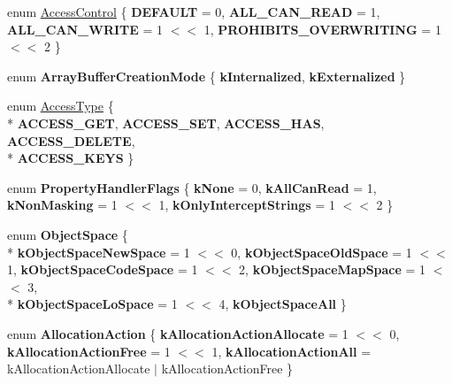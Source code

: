\begin{DoxyCompactItemize}
\item 
enum \hyperlink{namespacev8_a31d8355cb043d7d2dda3f4a52760b64e}{Access\+Control} \{ {\bfseries D\+E\+F\+A\+U\+L\+T} = 0, 
{\bfseries A\+L\+L\+\_\+\+C\+A\+N\+\_\+\+R\+E\+A\+D} = 1, 
{\bfseries A\+L\+L\+\_\+\+C\+A\+N\+\_\+\+W\+R\+I\+T\+E} = 1 $<$$<$ 1, 
{\bfseries P\+R\+O\+H\+I\+B\+I\+T\+S\+\_\+\+O\+V\+E\+R\+W\+R\+I\+T\+I\+N\+G} = 1 $<$$<$ 2
 \}
\item 
\hypertarget{namespacev8_aead63bf88a59e18b3768de9ac8d4b98d}{}enum {\bfseries Array\+Buffer\+Creation\+Mode} \{ {\bfseries k\+Internalized}, 
{\bfseries k\+Externalized}
 \}\label{namespacev8_aead63bf88a59e18b3768de9ac8d4b98d}

\item 
enum \hyperlink{namespacev8_add8bef6469c5b94706584124e610046c}{Access\+Type} \{ \\*
{\bfseries A\+C\+C\+E\+S\+S\+\_\+\+G\+E\+T}, 
{\bfseries A\+C\+C\+E\+S\+S\+\_\+\+S\+E\+T}, 
{\bfseries A\+C\+C\+E\+S\+S\+\_\+\+H\+A\+S}, 
{\bfseries A\+C\+C\+E\+S\+S\+\_\+\+D\+E\+L\+E\+T\+E}, 
\\*
{\bfseries A\+C\+C\+E\+S\+S\+\_\+\+K\+E\+Y\+S}
 \}
\item 
\hypertarget{namespacev8_af4789f0aeb8680e353901a35810cac1a}{}enum {\bfseries Property\+Handler\+Flags} \{ {\bfseries k\+None} = 0, 
{\bfseries k\+All\+Can\+Read} = 1, 
{\bfseries k\+Non\+Masking} = 1 $<$$<$ 1, 
{\bfseries k\+Only\+Intercept\+Strings} = 1 $<$$<$ 2
 \}\label{namespacev8_af4789f0aeb8680e353901a35810cac1a}

\item 
\hypertarget{namespacev8_ae7bc5b0bd1100e94d78de255daa8ebc3}{}enum {\bfseries Object\+Space} \{ \\*
{\bfseries k\+Object\+Space\+New\+Space} = 1 $<$$<$ 0, 
{\bfseries k\+Object\+Space\+Old\+Space} = 1 $<$$<$ 1, 
{\bfseries k\+Object\+Space\+Code\+Space} = 1 $<$$<$ 2, 
{\bfseries k\+Object\+Space\+Map\+Space} = 1 $<$$<$ 3, 
\\*
{\bfseries k\+Object\+Space\+Lo\+Space} = 1 $<$$<$ 4, 
{\bfseries k\+Object\+Space\+All}
 \}\label{namespacev8_ae7bc5b0bd1100e94d78de255daa8ebc3}

\item 
\hypertarget{namespacev8_ae2b70dd2abba164d9ad9ffc9f757eca9}{}enum {\bfseries Allocation\+Action} \{ {\bfseries k\+Allocation\+Action\+Allocate} = 1 $<$$<$ 0, 
{\bfseries k\+Allocation\+Action\+Free} = 1 $<$$<$ 1, 
{\bfseries k\+Allocation\+Action\+All} = k\+Allocation\+Action\+Allocate $\vert$ k\+Allocation\+Action\+Free
 \}\label{namespacev8_ae2b70dd2abba164d9ad9ffc9f757eca9}


\end{DoxyCompactItemize}
